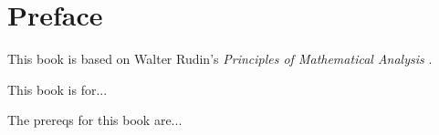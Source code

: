 \documentclass[../../templates/chapter]{subfiles}
\begin{document}
\chapter*{Preface}\label{chap:00-preface}

This book is based on Walter Rudin's \emph{Principles of Mathematical Analysis}
\cite{rudin}.

This book is for...

The prereqs for this book are...
\end{document}
